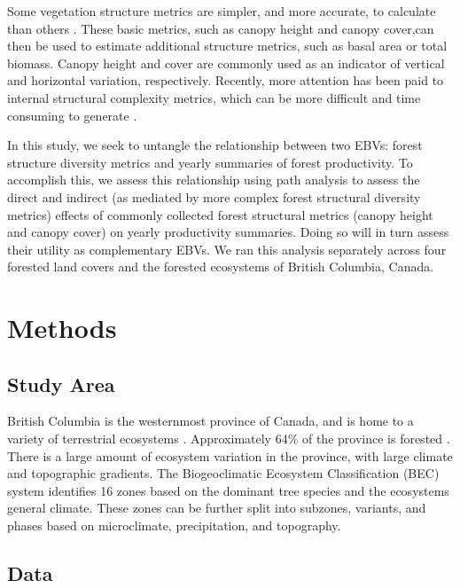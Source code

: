 \documentclass[
  authoryear,
  review,
  3p,
  twocolumn]{elsarticle}
\begin{document}
Some vegetation structure metrics are simpler, and more accurate, to
calculate than others \citep{coops2021}. These basic metrics, such as
canopy height and canopy cover,can then be used to estimate additional
structure metrics, such as basal area or total biomass. Canopy height
and cover are commonly used as an indicator of vertical and horizontal
variation, respectively. Recently, more attention has been paid to
internal structural complexity metrics, which can be more difficult and
time consuming to generate \citep{coops2021, ma2022} .

In this study, we seek to untangle the relationship between two EBVs:
forest structure diversity metrics and yearly summaries of forest
productivity. To accomplish this, we assess this relationship using path
analysis to assess the direct and indirect (as mediated by more complex
forest structural diversity metrics) effects of commonly collected
forest structural metrics (canopy height and canopy cover) on yearly
productivity summaries. Doing so will in turn assess their utility as
complementary EBVs. We ran this analysis separately across four forested
land covers and the forested ecosystems of British Columbia, Canada.

\hypertarget{methods}{%
\section{Methods}\label{methods}}

\hypertarget{study-area}{%
\subsection{Study Area}\label{study-area}}

British Columbia is the westernmost province of Canada, and is home to a
variety of terrestrial ecosystems \citep{pojar1987}. Approximately 64\%
of the province is forested \citep{bcministryofforests2003}. There is a
large amount of ecosystem variation in the province, with large climate
and topographic gradients. The Biogeoclimatic Ecosystem Classification
(BEC) system identifies 16 zones based on the dominant tree species and
the ecosystems general climate. These zones can be further split into
subzones, variants, and phases based on microclimate, precipitation, and
topography.

\hypertarget{data}{%
\subsection{Data}\label{data}}
\end{document}
